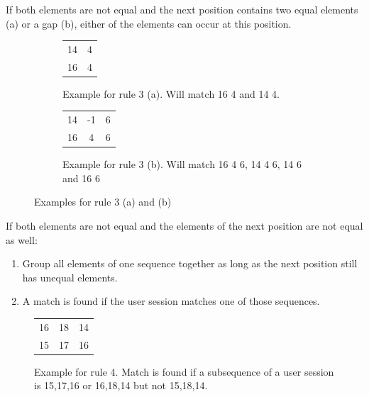 	\begin{rules}
	\item If both elements are not equal and the next position contains two equal elements (a) or a gap (b), either of the elements can occur at this position. 
	\end{rules}
	\begin{figure}[h]
		\centering
		\begin{subfigure}[b]{0.49\textwidth}
			\begin{tabular}{cc}
				 14 & 4\\
				 16 & 4\\  
			\end{tabular}
			\caption{Example for rule 3 (a). Will match 16 4 and 14 4.}
			\label{fig:rule3}
		\end{subfigure}
		\begin{subfigure}[b]{0.49\textwidth}
			\begin{tabular}{ccc}
				14 & -1 & 6\\
				16 & 4  & 6 \\
			\end{tabular}
			\caption{Example for rule 3 (b). Will match 16 4 6, 14 4 6, 14 6 and 16 6 }
		\end{subfigure}
		\caption{Examples for rule 3 (a) and (b)}
		\label{fig:rule3}
	\end{figure}
	\begin{rules}
	\item If both elements are not equal and the elements of the next position are not equal as well:
		\begin{enumerate}
			\item Group all elements of one sequence together as long as the next position still has unequal elements.
			\item A match is found if the user session matches one of those sequences. 
		\end{enumerate}
	\end{rules}
	\begin{figure}[h]
	\centering
	\begin{tabular}{ccc}
		 16 & 18 & 14 \\
		 15 & 17 & 16 \\  
	\end{tabular}
	\caption{Example for rule 4. Match is found if a subsequence of a user session is 15,17,16 or 16,18,14 but not 15,18,14.}
	\label{fig:rule4}
	\end{figure}

